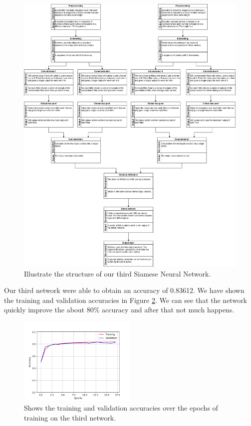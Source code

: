 \begin{figure}
    \centering
    \includegraphics[width=\textwidth]{./pictures/experiments/network3.png}
    \caption{Illustrate the structure of our third Siamese Neural Network.}
    \label{fig:network3}
\end{figure}

Our third network were able to obtain an accuracy of 0.83612. We have shown the
training and validation accuracies in Figure \ref{fig:network_3_accuracies}. We
can see that the network quickly improve the about 80\% accuracy and after that
not much happens.

\begin{figure}
    \centering
    \includegraphics[width=0.5\textwidth]{./pictures/experiments/network_3_accuracies.png}
    \caption{Shows the training and validation accuracies over the epochs of
        training on the third network.}
    \label{fig:network_3_accuracies}
\end{figure}

